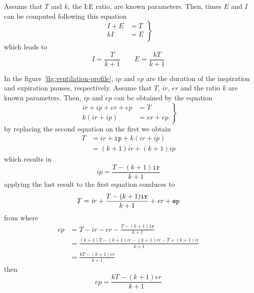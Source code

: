 \documentclass[a4paper]{article}
\begin{document}
Assume that $T$ and $k$, the I:E ratio, are known parameters. Then,
times $E$ and $I$ can be computed following this equation
\begin{equation*}
  \left.
    \begin{aligned}
      I+E &= T \\
      kI  &= E \\
    \end{aligned}
  \right\}
\end{equation*}
which leads to
\begin{equation}
  \label{eq:19}
  I = \frac{T}{k+1} \qquad E = \frac{kT}{k+1}
\end{equation}

In the figure~\ref{fig:ventilation-profile}, $\mathit{ip}$ and
$\mathit{ep}$ are the duration of the inspiration and expiration
pauses, respectively. Assume that $T$, $\mathit{ir}$, $\mathit{er}$
and the ratio $k$ are known parameters. Then, $\mathit{ip}$ and
$\mathit{ep}$ can be obtained by the equation
\begin{equation*}
  \left.
    \begin{aligned}
      \mathit{ir}+\mathit{ip}+\mathit{er}+\mathit{ep} &= T \\
      k(\mathit{ir}+\mathit{ip}) &= \mathit{er}+\mathit{ep}
    \end{aligned}
  \right\}
\end{equation*}
by replacing the second equation on the first we obtain
\begin{equation*}
  \begin{split}
    T &= \mathit{ir}+\mathtt{ip}+k(\mathit{ir}+\mathit{ip}) \\
      &= (k+1)\mathit{ir} + (k+1)\mathit{ip}
  \end{split}
\end{equation*}
which results in
\begin{equation}
  \label{eq:20}
  \mathit{ip} = \frac{T-(k+1)\mathtt{ir}}{k+1}
\end{equation}
applying the last result to the first equation conduces to
\begin{equation*}
  T = \mathit{ir}+\frac{T-(k+1)\mathtt{ir}}{k+1}+\mathit{er}+\mathtt{ep}\\
\end{equation*}
from where
\begin{equation*}
  \begin{split}
    \mathit{ep} &=
    T-\mathit{ir}-\mathit{er}-\frac{T-(k+1)\mathtt{ir}}{k+1}\\
    &=
    \frac{(k+1)T-(k+1)\mathit{ir}-(k+1)\mathit{er}-T+(k+1)\mathit{ir}}
    {k+1}\\
    &= \frac{kT-(k+1)\mathit{er}}{k+1}
  \end{split}
\end{equation*}
then
\begin{equation}
  \label{eq:25}
  \mathit{ep} = \frac{kT-(k+1)\mathit{er}}{k+1}
\end{equation}
\end{document}
